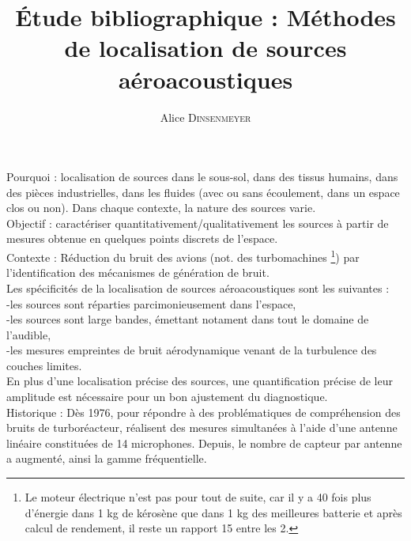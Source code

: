 \documentclass[twocolumn, 11pt]{article}
\title{
\centering \fontsize{18pt}{10pt}\textbf{Étude bibliographique : Méthodes de localisation de sources aéroacoustiques}
}
\author{
\large{Alice \textsc{Dinsenmeyer}}\\[2mm] %
\vspace{-5mm}
}
\date{}
\begin{document}
\maketitle %

\thispagestyle{fancy} %




Pourquoi : localisation de sources dans le sous-sol, dans des tissus humains, dans des pièces industrielles, dans les fluides (avec ou sans écoulement, dans un espace clos ou non). Dans chaque contexte, la nature des sources varie.\\

Objectif : caractériser quantitativement/qualitativement les sources à partir de mesures obtenue en quelques points  discrets de l'espace.\\

Contexte : Réduction du bruit des avions (not. des turbomachines \footnote{Le moteur électrique n'est pas pour tout de suite, car il y a 40 fois plus d'énergie dans 1 kg de kérosène que dans 1 kg des meilleures batterie et après calcul de rendement, il reste un rapport 15 entre les 2.}) par l'identification des mécanismes de génération de bruit.\\

Les spécificités de la localisation de sources aéroacoustiques sont les suivantes : \\
-les sources sont réparties parcimonieusement dans l'espace,\\
-les sources sont large bandes, émettant notament dans tout le domaine de l'audible,\\
-les mesures empreintes de bruit aérodynamique venant de la turbulence des couches limites.\\
En plus d'une localisation précise des sources, une quantification précise de leur amplitude est nécessaire pour un bon ajustement du diagnostique.\\

Historique : Dès 1976, pour répondre à des problématiques de compréhension des bruits de turboréacteur, \cite{Billingsley1976} réalisent des mesures simultanées à l'aide d'une antenne linéaire constituées de 14 microphones. Depuis, le nombre de capteur par antenne a augmenté, ainsi la gamme fréquentielle.
\end{document}
